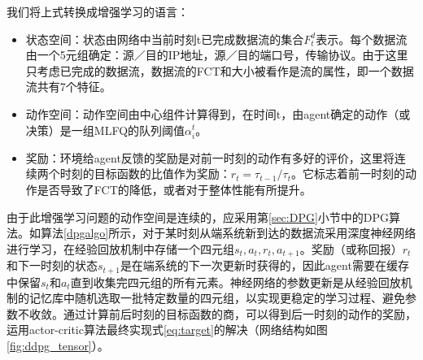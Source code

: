 我们将上式转换成增强学习的语言：
\begin{itemize}
    \item 状态空间：状态由网络中当前时刻t已完成数据流的集合$F_t^d$表示。每个数据流由一个5元组确定：源／目的IP地址，源／目的端口号，传输协议。由于这里只考虑已完成的数据流，数据流的FCT和大小被看作是流的属性，即一个数据流共有7个特征。
    \item 动作空间：动作空间由中心组件计算得到，在时间t，由agent确定的动作（或决策）是一组MLFQ的队列阈值${\alpha_i^t}$。
    \item 奖励：环境给agent反馈的奖励是对前一时刻的动作有多好的评价，这里将连续两个时刻的目标函数的比值作为奖励：$r_t = \tau_{t-1} / \tau_{t}$。它标志着前一时刻的动作是否导致了FCT的降低，或者对于整体性能有所提升。
\end{itemize}

由于此增强学习问题的动作空间是连续的，应采用第\ref{sec:DPG}小节中的DPG算法。如算法\ref{dpgalgo}所示，对于某时刻从端系统新到达的数据流采用深度神经网络进行学习，在经验回放机制中存储一个四元组${s_t, a_t, r_t, a_{t+1}}$。奖励（或称回报）$r_t$和下一时刻的状态$s_{t+1}$是在端系统的下一次更新时获得的，因此agent需要在缓存中保留$s_t$和$a_t$直到收集完四元组的所有元素。神经网络的参数更新是从经验回放机制的记忆库中随机选取一批特定数量的四元组，以实现更稳定的学习过程、避免参数不收敛。通过计算前后时刻的目标函数的商，可以得到后一时刻的动作的奖励，运用actor-critic算法最终实现式\ref{eq:target}的解决（网络结构如图\ref{fig:ddpg_tensor}）。


